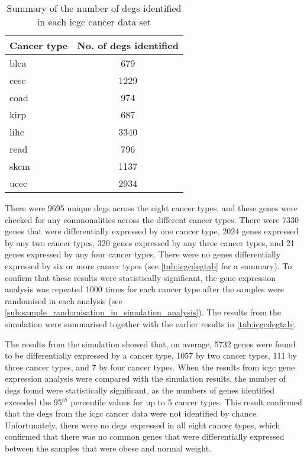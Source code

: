 \begin{table}[htbp]
	\centering
	\caption{Summary of the number of \glspl{deg} identified in each \gls{icgc} cancer data set}
	\label{tab:icgcdegnum}
	\begin{tabular}{lc}
		Cancer type & No. of \glspl{deg} identified\\
		\hline
		\hline
		\rule{0pt}{2.25ex}\gls{blca} & 679 \\
		\gls{cesc} & 1229\\
		\gls{coad} & 974\\
		\gls{kirp} & 687\\
		\gls{lihc} & 3340\\
		\gls{read} & 796\\
		\gls{skcm} & 1137\\
		\gls{ucec} & 2934\\
		\hline
		\hline
	\end{tabular}
\end{table}

There were 9695 unique \glspl{deg} across the eight cancer types, and these genes were checked for any commonalities across the different cancer types.
There were 7330 genes that were differentially expressed by one cancer type, 2024 genes expressed by any two cancer types, 320 genes expressed by any three cancer types, and 21 genes expressed by any four cancer types.
There were no genes differentially expressed by six or more cancer types (see \cref{tab:icgcdegtab} for a summary).
To confirm that these results were statistically significant, the gene expression analysis was repeated 1000 times for each cancer type after the samples were randomised in each analysis (see \cref{sub:sample_randomisation_in_simulation_analysis}).
The results from the simulation were summarised together with the earlier results in \cref{tab:icgcdegtab}.

The results from the simulation showed that, on average, 5732 genes were found to be differentially expressed by a cancer type, 1057 by two cancer types, 111 by three cancer types, and 7 by four cancer types.
When the results from \gls{icgc} gene expression analysis were compared with the simulation results, the number of \glspl{deg} found were statistically significant, as the numbers of genes identified exceeded the 95$^{th}$ percentile values for up to 5 cancer types.
This result confirmed that the \glspl{deg} from the \gls{icgc} cancer data were not identified by chance.
Unfortunately, there were no \glspl{deg} expressed in all eight cancer types, which confirmed that there was no common genes that were differentially expressed between the samples that were obese and normal weight.

